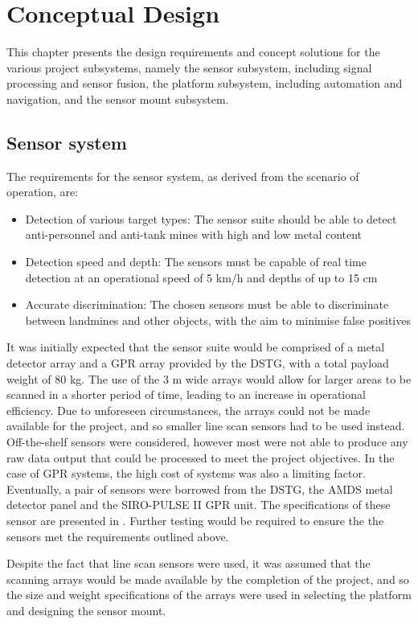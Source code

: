\documentclass[main.tex]{subfiles}
\begin{document}
\chapter{Conceptual Design}
This chapter presents the design requirements and concept solutions for the various project subsystems, namely the sensor subsystem, including signal processing and sensor fusion, the platform subsystem, including automation and navigation, and the sensor mount subsystem. 

\section{Sensor system}
The requirements for the sensor system, as derived from the scenario of operation, are:
\begin{itemize}
\item Detection of various target types: The sensor suite should be able to detect anti-personnel and anti-tank mines with high and low metal content 
\item Detection speed and depth: The sensors must be capable of real time detection at an operational speed of 5 km/h and depths of up to 15 cm
\item Accurate discrimination: The chosen sensors must be able to discriminate between landmines and other objects, with the aim to minimise false positives
\end{itemize}
It was initially expected that the sensor suite would be comprised of a metal detector array and a GPR array provided by the DSTG, with a total payload weight of 80 kg. The use of the 3 m wide arrays would allow for larger areas to be scanned in a shorter period of time, leading to an increase in operational efficiency. Due to unforeseen circumstances, the arrays could not be made available for the project, and so smaller line scan sensors had to be used instead. Off-the-shelf sensors were considered, however most were not able to produce any raw data output that could be processed to meet the project objectives. In the case of GPR systems, the high cost of systems was also a limiting factor. Eventually, a pair of sensors were borrowed from the DSTG, the AMDS metal detector panel and the SIRO-PULSE II GPR unit. The specifications of these sensor are presented in . Further testing would be required to ensure the the sensors met the requirements outlined above. 

Despite the fact that line scan sensors were used, it was assumed that the scanning arrays would be made available by the completion of the project, and so the size and weight specifications of the arrays were used in selecting the platform and designing the sensor mount. 
\end{document}

